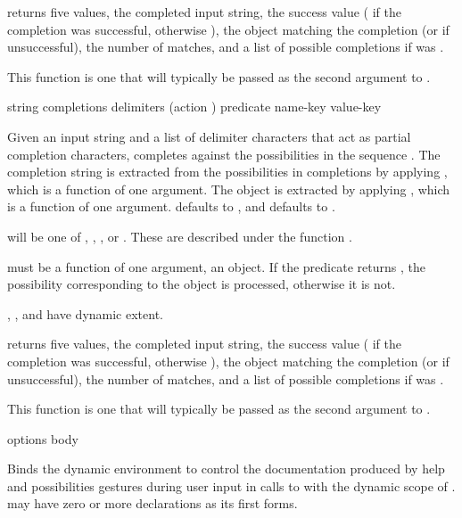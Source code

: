  returns five values, the completed input string,
the success value ( if the completion was successful, otherwise
), the object matching the completion (or  if unsuccessful),
the number of matches, and a list of possible completions if  was
.

This function is one that will typically be passed as the second argument to
.

 {string completions delimiters
                                      \key (action ) predicate
                                           name-key value-key}


Given an input string  and a list of delimiter characters
 that act as partial completion characters,
 completes against the possibilities in the
sequence .  The completion string is extracted from the
possibilities in completions by applying , which is a function of
one argument.  The object is extracted by applying , which is a
function of one argument.   defaults to , and
 defaults to .

 will be one of , ,
, or .  These are described under the
function .

 must be a function of one argument, an object.  If the predicate
returns , the possibility corresponding to the object is processed,
otherwise it is not.

, , and  have dynamic extent.

 returns five values, the completed input
string, the success value ( if the completion was successful,
otherwise ), the object matching the completion (or  if
unsuccessful), the number of matches, and a list of possible completions if
 was .

This function is one that will typically be passed as the second argument to
.


 {options \body body}

Binds the dynamic environment to control the documentation produced by help and
possibilities gestures during user input in calls to  with the
dynamic scope of .   may have zero or more declarations as
its first forms.

